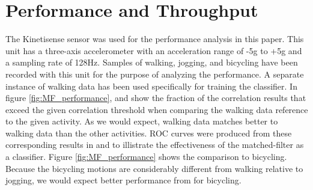 \documentclass[journal]{IEEEtran}
\begin{document}
\section{Performance and Throughput}
%
The Kinetisense sensor was used for the performance analysis in this paper.
This unit has a three-axis accelerometer with an acceleration range of -5g to +5g and a sampling rate of 128Hz.
Samples of walking, jogging, and bicycling have been recorded with this unit for the purpose of analyzing the performance.
A separate instance of walking data has been used specifically for training the classifier.
In figure \ref{fig:MF_performance},  and  show the fraction of the correlation results that exceed the given correlation threshold when comparing the walking data reference to the given activity.
As we would expect, walking data matches better to walking data than the other activities.
ROC curves were produced from these corresponding results in  and  to illistrate the effectiveness of the matched-filter as a classifier.
Figure \ref{fig:MF_performance} shows the comparison to bicycling.
Because the bicycling motions are considerably different from walking relative to jogging, we would expect better performance from for bicycling.
%
%
\end{document}
